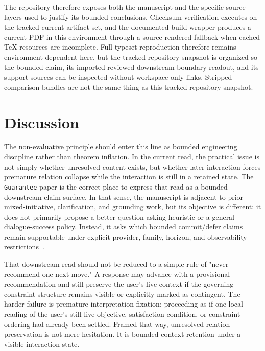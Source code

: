 \documentclass[11pt]{article}
\renewcommand{\_}{\textunderscore\hspace{0pt}}
\begin{document}
\begin{sloppypar}
The repository therefore exposes both the manuscript and the specific source
layers used to justify its bounded conclusions. Checksum verification
executes on the tracked current artifact set, and the documented build wrapper
produces a current PDF in this environment through a source-rendered fallback
when cached TeX resources are incomplete. Full typeset reproduction therefore
remains environment-dependent here, but the tracked repository snapshot is
organized so the bounded claim, its imported reviewed downstream-boundary
readout, and its support sources can be inspected without workspace-only links.
Stripped comparison bundles are not the same thing as this tracked repository
snapshot.
\end{sloppypar}

\section{Discussion}

The non-evaluative principle should enter this line as bounded engineering
discipline rather than theorem inflation. In the current read, the practical issue
is not simply whether unresolved content exists, but whether later interaction
forces premature relation collapse while the interaction is still in a retained
state. The \texttt{Guarantee} paper is the correct place to express that read as
a bounded downstream claim surface. In that sense, the manuscript is adjacent to
prior mixed-initiative, clarification, and grounding work, but its objective is
different: it does not primarily propose a better question-asking heuristic or a
general dialogue-success policy. Instead, it asks which bounded commit/defer
claims remain supportable under explicit provider, family, horizon, and
observability restrictions~\cite{chucarroll2000mimic,deboni2003clarification,rao2018evpi,benotti2021grounding,sahay-etal-2025-ask,wen-etal-2025-know,madhusudhan-etal-2025-llms}.

That downstream read should not be reduced to a simple rule of "never recommend
one next move." A response may advance with a provisional recommendation and
still preserve the user's live context if the governing constraint structure
remains visible or explicitly marked as contingent. The harder failure is
premature interpretation fixation: proceeding as if one local reading of the
user's still-live objective, satisfaction condition, or constraint ordering had
already been settled. Framed that way, unresolved-relation preservation is not
mere hesitation. It is bounded context retention under a visible interaction
state.
\end{document}
